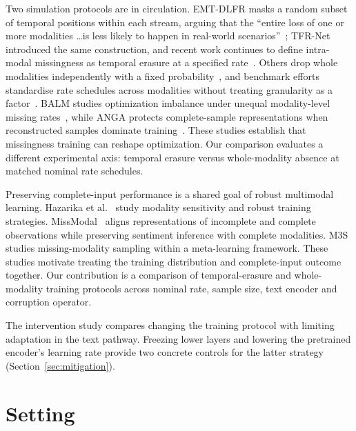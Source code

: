 \documentclass[preprint,11pt]{elsarticle}
\begin{document}
Two simulation protocols are in circulation. EMT-DLFR masks a random subset of
temporal positions within each stream, arguing that the ``entire loss of one or
more modalities \ldots is less likely to happen in real-world
scenarios''~\cite{emtdlfr}; TFR-Net~\cite{tfrnet} introduced the same
construction, and recent work continues to define intra-modal missingness as
temporal erasure at a specified rate~\cite{mrcf}. Others drop whole modalities
independently with a fixed probability~\cite{sieve}, and benchmark efforts
standardise rate schedules across modalities without treating granularity as a
factor~\cite{missbench}. BALM studies optimization imbalance under unequal
modality-level missing rates~\cite{balm}, while ANGA protects complete-sample
representations when reconstructed samples dominate training~\cite{anga}.
These studies establish that missingness training can reshape optimization.
Our comparison evaluates a different experimental axis: temporal erasure versus
whole-modality absence at matched nominal rate schedules.

Preserving complete-input performance is a shared goal of robust multimodal
learning. Hazarika et al.~\cite{hazarika2022} study modality sensitivity and
robust training strategies. MissModal~\cite{missmodal} aligns representations
of incomplete and complete observations while preserving sentiment inference
with complete modalities. M3S~\cite{m3s} studies missing-modality sampling
within a meta-learning framework. These studies motivate treating the training
distribution and complete-input outcome together. Our contribution is a
comparison of temporal-erasure and whole-modality training protocols across
nominal rate, sample size, text encoder and corruption operator.

The intervention study compares changing the training protocol with limiting
adaptation in the text pathway. Freezing lower layers and lowering the
pretrained encoder's learning rate provide two concrete controls for the
latter strategy (Section~\ref{sec:mitigation}).

\section{Setting}\label{sec:setting}
\end{document}
